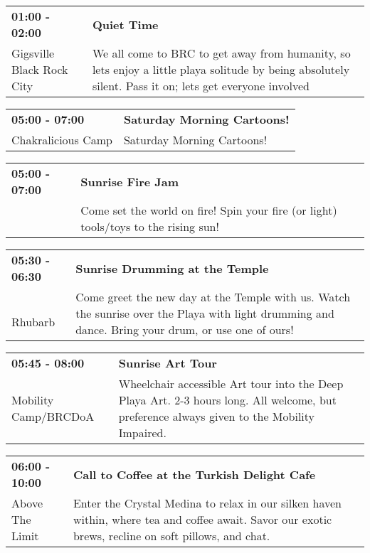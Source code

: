 \begin{tabular}{ p{1in} p{2.2in} }
    \textbf{01:00 - 02:00} & \textbf{Quiet Time} \\
    Gigsville \newline Black Rock City & We all come to BRC to get away from humanity, so lets enjoy a little playa solitude by being absolutely silent. Pass it on; lets get everyone involved \\
    \hline 
\end{tabular}
    
\begin{tabular}{ p{1in} p{2.2in} }
    \textbf{05:00 - 07:00} & \textbf{Saturday Morning Cartoons!} \\
    Chakralicious Camp \newline  & Saturday Morning Cartoons! \\
    \hline 
\end{tabular}
    
\begin{tabular}{ p{1in} p{2.2in} }
    \textbf{05:00 - 07:00} & \textbf{Sunrise Fire Jam} \\
    ~ \newline  & Come set the world on fire!  Spin your fire (or light) tools/toys to the rising sun! \\
    \hline 
\end{tabular}
    
\begin{tabular}{ p{1in} p{2.2in} }
    \textbf{05:30 - 06:30} & \textbf{Sunrise Drumming at the Temple} \\
    ~ \newline Rhubarb & Come greet the new day at the Temple with us. Watch the sunrise over the Playa with light drumming and dance. Bring your drum, or use one of ours! \\
    \hline 
\end{tabular}
    
\begin{tabular}{ p{1in} p{2.2in} }
    \textbf{05:45 - 08:00} & \textbf{Sunrise Art Tour} \\
    Mobility Camp/BRCDoA \newline  & Wheelchair accessible Art tour into the Deep Playa Art.
2-3 hours long. All welcome, but preference always given to the Mobility Impaired. \\
    \hline 
\end{tabular}
    
\begin{tabular}{ p{1in} p{2.2in} }
    \textbf{06:00 - 10:00} & \textbf{Call to Coffee at the Turkish Delight Cafe} \\
    Above The Limit \newline  & Enter the Crystal Medina to relax in our silken haven within, where tea and coffee await. Savor our exotic brews, recline on soft pillows, and chat. \\
    \hline 
\end{tabular}
    
